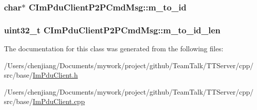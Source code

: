 \subsubsection[{m\+\_\+to\+\_\+id}]{\setlength{\rightskip}{0pt plus 5cm}char$\ast$ C\+Im\+Pdu\+Client\+P2\+P\+Cmd\+Msg\+::m\+\_\+to\+\_\+id\hspace{0.3cm}{\ttfamily [private]}}\label{class_c_im_pdu_client_p2_p_cmd_msg_a4ede4105b2e44d49a06034290fd05330}
\hypertarget{class_c_im_pdu_client_p2_p_cmd_msg_a372b995a9bd48c05767aeff25ebf4613}{}
\subsubsection[{m\+\_\+to\+\_\+id\+\_\+len}]{\setlength{\rightskip}{0pt plus 5cm}uint32\+\_\+t C\+Im\+Pdu\+Client\+P2\+P\+Cmd\+Msg\+::m\+\_\+to\+\_\+id\+\_\+len\hspace{0.3cm}{\ttfamily [private]}}\label{class_c_im_pdu_client_p2_p_cmd_msg_a372b995a9bd48c05767aeff25ebf4613}


The documentation for this class was generated from the following files\+:\begin{DoxyCompactItemize}
\item 
/\+Users/chenjiang/\+Documents/mywork/project/github/\+Team\+Talk/\+T\+T\+Server/cpp/src/base/\hyperlink{_im_pdu_client_8h}{Im\+Pdu\+Client.\+h}\item 
/\+Users/chenjiang/\+Documents/mywork/project/github/\+Team\+Talk/\+T\+T\+Server/cpp/src/base/\hyperlink{_im_pdu_client_8cpp}{Im\+Pdu\+Client.\+cpp}\end{DoxyCompactItemize}
